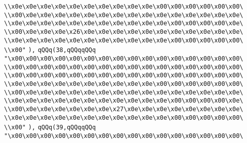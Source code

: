 \verb|\\x0e\x0e\x0e\x0e\x0e\x0e\x0e\x0e\x0e\x0e\x00\x00\x00\x00\x00\x00\|\newline
\verb|\\x00\x0e\x0e\x0e\x0e\x0e\x0e\x0e\x0e\x0e\x0e\x0e\x0e\x0e\x0e\x0e\|\newline
\verb|\\x0e\x0e\x0e\x0e\x0e\x0e\x0e\x0e\x0e\x0e\x0e\x00\x00\x00\x00\x0e\|\newline
\verb|\\x00\x0e\x0e\x0e\x26\x0e\x0e\x0e\x0e\x0e\x0e\x0e\x0e\x0e\x0e\x0e\|\newline
\verb|\\x0e\x0e\x0e\x0e\x0e\x0e\x0e\x0e\x0e\x0e\x0e\x00\x00\x00\x00\x00\|\newline
\verb|\\x00"|\newline
\verb|),|\newline
\verb|qQQq(38,qQQqqQQq|\newline
\verb|"\x00\x00\x00\x00\x00\x00\x00\x00\x00\x00\x00\x00\x00\x00\x00\x00\|\newline
\verb|\\x00\x00\x00\x00\x00\x00\x00\x00\x00\x00\x00\x00\x00\x00\x00\x00\|\newline
\verb|\\x00\x00\x00\x00\x00\x00\x00\x00\x00\x00\x00\x00\x00\x00\x00\x00\|\newline
\verb|\\x0e\x0e\x0e\x0e\x0e\x0e\x0e\x0e\x0e\x0e\x00\x00\x00\x00\x00\x00\|\newline
\verb|\\x00\x0e\x0e\x0e\x0e\x0e\x0e\x0e\x0e\x0e\x0e\x0e\x0e\x0e\x0e\x0e\|\newline
\verb|\\x0e\x0e\x0e\x0e\x0e\x0e\x0e\x0e\x0e\x0e\x0e\x00\x00\x00\x00\x0e\|\newline
\verb|\\x00\x0e\x0e\x0e\x0e\x0e\x0e\x27\x0e\x0e\x0e\x0e\x0e\x0e\x0e\x0e\|\newline
\verb|\\x0e\x0e\x0e\x0e\x0e\x0e\x0e\x0e\x0e\x0e\x0e\x00\x00\x00\x00\x00\|\newline
\verb|\\x00"|\newline
\verb|),|\newline
\verb|qQQq(39,qQQqqQQq|\newline
\verb|"\x00\x00\x00\x00\x00\x00\x00\x00\x00\x00\x00\x00\x00\x00\x00\x00\|\newline
